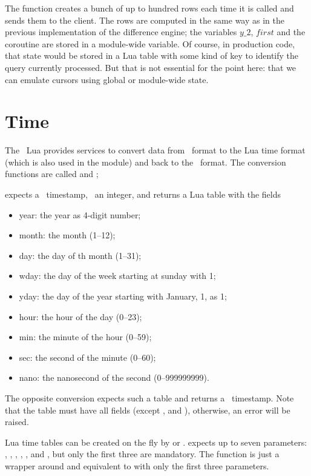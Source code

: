 The function creates a bunch of
up to hundred rows each time it is called
and sends them to the client.
The rows are computed in the same way
as in the previous implementation of
the difference engine;
the variables $y\_2$, $first$ and
the coroutine  are stored
in a module-wide variable.
Of course, in production code,
that state would be stored
in a Lua table with some kind
of key to identify the query
currently processed. But that
is not essential for the point
here: that we can emulate cursors
using global or module-wide state.

\section{Time}
The \nowdb\ Lua 
provides services to convert
data from \nowdb\ format to
the Lua time format (which is also
used in the  module)
and back to the \nowdb\ format.
The conversion functions are
called  and ;

 expects a \nowdb\ timestamp,
\ie\ an integer, and returns a Lua table with
the fields

\begin{itemize}
\item year: the year as 4-digit number;
\item month: the month (1--12);
\item day: the day of th month (1--31);
\item wday: the day of the week starting at sunday with 1;
\item yday: the day of the year starting with January, 1, as 1;
\item hour: the hour of the day (0--23);
\item min: the minute of the hour (0--59);
\item sec: the second of the minute (0--60);
\item nano: the nanosecond of the second (0--999999999).
\end{itemize}

The opposite conversion  expects
such a table and returns a \nowdb\ timestamp.
Note that the table must have all fields
(except ,  and ), otherwise,
an error will be raised.

Lua time tables can be created on the fly
by  or .
 expects up to seven parameters:
, , ,
, , 
and , but only the first three
are mandatory. The  function
is just a wrapper around  and
equivalent to  with only
the first three parameters.


